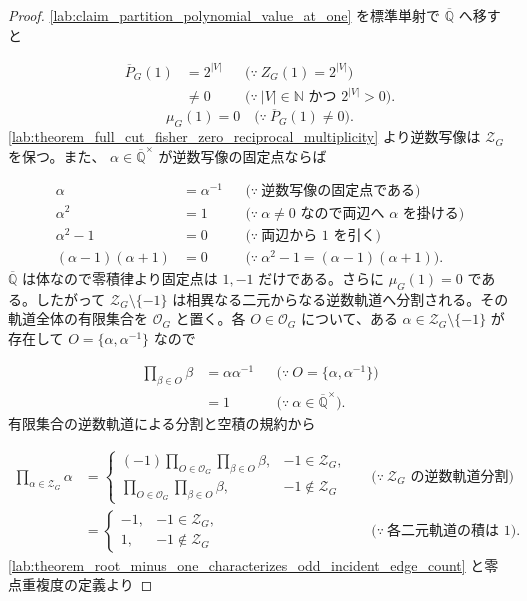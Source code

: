 \documentclass[11pt,a4paper]{article}
\theoremstyle{remark}
\begin{document}
\begin{proof}
\cref{lab:claim_partition_polynomial_value_at_one}
 を標準単射で 
$\overline{\mathbb Q}$
 へ移すと

\[\begin{aligned}
\overline P_G(1)
&=2^{|V|}
&&\bigl(\because\ Z_G(1)=2^{|V|}\bigr)\\
&\ne0
&&\bigl(\because\ |V|\in\mathbb N\text{ かつ }2^{|V|}>0\bigr).
\end{aligned}\]
\[\mu_G(1)=0
\quad\bigl(\because\ \overline P_G(1)\ne0\bigr).\]
\cref{lab:theorem_full_cut_fisher_zero_reciprocal_multiplicity}
 より逆数写像は 
$\mathcal Z_G$
 を保つ。また、
$\alpha\in\overline{\mathbb Q}^{\times}$
 が逆数写像の固定点ならば

\[\begin{aligned}
\alpha
&=\alpha^{-1}
&&\bigl(\because\ \text{逆数写像の固定点である}\bigr)\\
\alpha^2
&=1
&&\bigl(\because\ \alpha\ne0\text{ なので両辺へ }\alpha\text{ を掛ける}\bigr)\\
\alpha^2-1
&=0
&&\bigl(\because\ \text{両辺から }1\text{ を引く}\bigr)\\
(\alpha-1)(\alpha+1)
&=0
&&\bigl(\because\ \alpha^2-1=(\alpha-1)(\alpha+1)\bigr).
\end{aligned}\]
$\overline{\mathbb Q}$
 は体なので零積律より固定点は 
$1,-1$
 だけである。さらに 
$\mu_G(1)=0$
 である。したがって 
$\mathcal Z_G\setminus\{-1\}$
 は相異なる二元からなる逆数軌道へ分割される。その軌道全体の有限集合を 
$\mathcal O_G$
 と置く。各 
$O\in\mathcal O_G$
 について、ある 
$\alpha\in\mathcal Z_G\setminus\{-1\}$
 が存在して 
$O=\{\alpha,\alpha^{-1}\}$
 なので

\[\begin{aligned}
\prod_{\beta\in O}\beta
&=\alpha\alpha^{-1}
&&\bigl(\because\ O=\{\alpha,\alpha^{-1}\}\bigr)\\
&=1
&&\bigl(\because\ \alpha\in\overline{\mathbb Q}^{\times}\bigr).
\end{aligned}\]
有限集合の逆数軌道による分割と空積の規約から

\[\begin{aligned}
\prod_{\alpha\in\mathcal Z_G}\alpha
&=
\begin{cases}
(-1)\displaystyle\prod_{O\in\mathcal O_G}\prod_{\beta\in O}\beta,&-1\in\mathcal Z_G,\\
\displaystyle\prod_{O\in\mathcal O_G}\prod_{\beta\in O}\beta,&-1\notin\mathcal Z_G
\end{cases}
&&\bigl(\because\ \mathcal Z_G\text{ の逆数軌道分割}\bigr)\\
&=
\begin{cases}
-1,&-1\in\mathcal Z_G,\\
1,&-1\notin\mathcal Z_G
\end{cases}
&&\bigl(\because\ \text{各二元軌道の積は }1\bigr).
\end{aligned}\]
\cref{lab:theorem_root_minus_one_characterizes_odd_incident_edge_count}
 と零点重複度の定義より


\end{proof}
\end{document}
